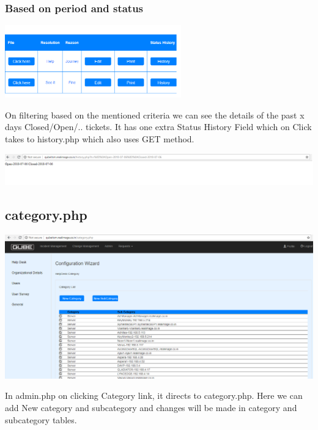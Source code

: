 \documentclass{article}
\begin{document}
\subsubsection{Based on period and status}
\begin{center}

    \includegraphics[width=3.0in]{view1.png}
   
    \label{}

\end{center}
On filtering based on the mentioned criteria we can see the details of the past x days Closed/Open/.. tickets. It has one extra Status History Field which on Click takes to history.php which also uses GET method.
\begin{center}

    \includegraphics[width=7.0in]{history.png}
   
    \label{}

\end{center}
\subsection{category.php}
\begin{center}

    \includegraphics[width=7.0in]{category.png}
   
    \label{}

\end{center}
In admin.php on clicking Category link, it directs to category.php. Here we can add New category and subcategory and changes will be made in category and subcategory tables.
\end{document}
